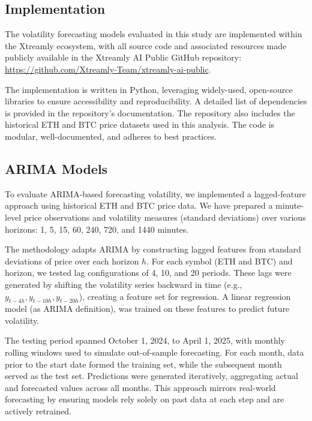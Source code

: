 \documentclass[9pt]{article}
\begin{document}
\begin{multicols}{2}
		
	\section{Implementation}
	
	The volatility forecasting models evaluated in this study are implemented within the Xtreamly ecosystem, with all source code and associated resources made publicly available in the Xtreamly AI Public GitHub repository: \url{https://github.com/Xtreamly-Team/xtreamly-ai-public}. 
	
	The implementation is written in Python, leveraging widely-used, open-source libraries to ensure accessibility and reproducibility. A detailed list of dependencies is provided in the repository's documentation. The repository also includes the historical ETH and BTC price datasets used in this analysis. The code is modular, well-documented, and adheres to best practices.
		
		\subsection{ARIMA Models}
		
		To evaluate ARIMA-based forecasting volatility, we implemented a lagged-feature approach using historical ETH and BTC price data. We have prepared a minute-level price observations and volatility measures (standard deviations) over various horizons: 1, 5, 15, 60, 240, 720, and 1440 minutes.
		
		\smallskip
		
		The methodology adapts ARIMA by constructing lagged features from standard deviations of price over each horizon \( h \). For each symbol (ETH and BTC) and horizon, we tested lag configurations of 4, 10, and 20 periods. These lags were generated by shifting the volatility series backward in time (e.g., \( y_{t-4h}, y_{t-10h}, y_{t-20h} \)), creating a feature set for regression. A linear regression model (as ARIMA definition), was trained on these features to predict future volatility.
		
		The testing period spanned October 1, 2024, to April 1, 2025, with monthly rolling windows used to simulate out-of-sample forecasting. For each month, data prior to the start date formed the training set, while the subsequent month served as the test set. Predictions were generated iteratively, aggregating actual and forecasted values across all months. This approach mirrors real-world forecasting by ensuring models rely solely on past data at each step and are actively retrained.
		

\end{multicols}
\end{document}
